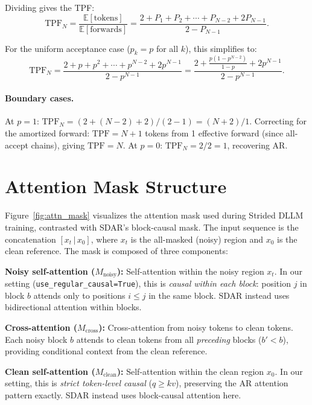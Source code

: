Dividing gives the TPF:
\begin{equation}
    \text{TPF}_N = \frac{\mathbb{E}[\text{tokens}]}{\mathbb{E}[\text{forwards}]} = \frac{2 + P_1 + P_2 + \cdots + P_{N-2} + 2P_{N-1}}{2 - P_{N-1}}.
\end{equation}

For the uniform acceptance case ($p_k = p$ for all $k$), this simplifies to:
\begin{equation}
    \text{TPF}_N = \frac{2 + p + p^2 + \cdots + p^{N-2} + 2p^{N-1}}{2 - p^{N-1}} = \frac{2 + \frac{p(1 - p^{N-2})}{1 - p} + 2p^{N-1}}{2 - p^{N-1}}.
\end{equation}

\paragraph{Boundary cases.} At $p = 1$: $\text{TPF}_N = (2 + (N-2) + 2) / (2 - 1) = (N+2)/1$. Correcting for the amortized forward: $\text{TPF} = N + 1$ tokens from 1 effective forward (since all-accept chains), giving $\text{TPF} = N$. At $p = 0$: $\text{TPF}_N = 2 / 2 = 1$, recovering AR.

\section{Attention Mask Structure}
\label{app:attn_mask}

Figure~\ref{fig:attn_mask} visualizes the attention mask used during Strided DLLM training, contrasted with SDAR's block-causal mask. The input sequence is the concatenation $[x_t \,|\, x_0]$, where $x_t$ is the all-masked (noisy) region and $x_0$ is the clean reference. The mask is composed of three components:

\begin{denseitemize}
    \item \textbf{Noisy self-attention ($M_\text{noisy}$):} Self-attention within the noisy region $x_t$. In our setting (\texttt{use\_regular\_causal=True}), this is \emph{causal within each block}: position $j$ in block $b$ attends only to positions $i \leq j$ in the same block. SDAR instead uses bidirectional attention within blocks.
    \item \textbf{Cross-attention ($M_\text{cross}$):} Cross-attention from noisy tokens to clean tokens. Each noisy block $b$ attends to clean tokens from all \emph{preceding} blocks ($b' < b$), providing conditional context from the clean reference.
    \item \textbf{Clean self-attention ($M_\text{clean}$):} Self-attention within the clean region $x_0$. In our setting, this is \emph{strict token-level causal} ($q \geq kv$), preserving the AR attention pattern exactly. SDAR instead uses block-causal attention here.
\end{denseitemize}

